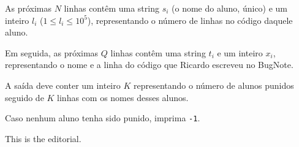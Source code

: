 As próximas $N$ linhas contêm uma string $s_i$ (o nome do aluno, único) e um inteiro $l_i$ ($1 \leq l_i \leq 10^5$), representando o número de linhas no código daquele aluno.

Em seguida, as próximas $Q$ linhas contêm uma string $t_i$ e um inteiro $x_i$, representando o nome e a linha do código que Ricardo escreveu no BugNote.

A saída deve conter um inteiro $K$ representando o número de alunos punidos seguido de $K$ linhas com os nomes desses alunos.

Caso nenhum aluno tenha sido punido, imprima \texttt{-1}.

This is the editorial.
